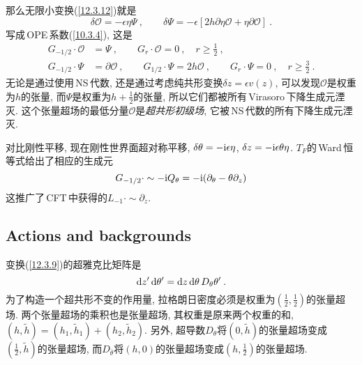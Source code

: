 那么无限小变换(\ref{12.3.12})就是
\begin{equation}
    \delta \mathcal{O} = -\epsilon\eta\varPsi\:, \qquad 
    \delta \varPsi=-\epsilon[2h\partial\eta \mathcal{O}+\eta\partial\mathcal{O}] \:. \label{12.3.14}
\end{equation}
写成\,OPE\,系数(\ref{10.3.4}), 这是
\begin{subequations}
\begin{align}
    G_{-1/2}\cdot \mathcal{O} &= \varPsi\:, \qquad G_{r}\cdot \mathcal{O}=0\:, \quad r\geq \tfrac{1}{2} \:,\label{12.3.15a} \\ 
    G_{-1/2}\cdot \varPsi &= \partial\mathcal{O}\:, \qquad G_{1/2}\cdot \varPsi = 2h\mathcal{O}\:,
    \qquad G_{r}\cdot\varPsi=0\:,\quad r\geq \tfrac{3}{2} \:. \label{12.3.15b}
\end{align}\label{12.3.15}
\end{subequations}
无论是通过使用\,NS\,代数, 还是通过考虑纯共形变换$ \delta z=\epsilon v(z)$, 可以发现$ \mathcal{O} $是权重为$ h $的张量, 而$ \varPsi $是权重为$ h+\tfrac{1}{2} $的张量, 所以它们都被所有\,Virasoro\,下降生成元湮灭. 这个张量超场的最低分量$ \mathcal{O} $是{\emph{超共形初级场}}, 它被\,NS\,代数的所有下降生成元湮灭.

对比刚性平移, 现在刚性世界面超对称平移, $\delta\theta =-\mathrm{i}\epsilon\eta$, $\delta z=-\mathrm{i}\epsilon\theta\eta$. $T_{F} $的\,Ward\,恒等式给出了相应的生成元
\begin{equation}
    G_{-1/2}\cdot \sim -\mathrm{i} Q_{\theta} = -\mathrm{i}(\partial_{\theta}-\theta\partial_{z}) \label{12.3.16}
\end{equation}
这推广了\,CFT\,中获得的$ L_{-1}\cdot \sim \partial_{z}$.

\subsection*{Actions and backgrounds}

变换(\ref{12.3.9})的超雅克比矩阵是
\begin{equation}
    \mathrm{d} z^{\prime}\,\mathrm{d}\theta^{\prime} = \mathrm{d} z\,\mathrm{d}\theta\,D_{\theta}\theta^{\prime}\:. \label{12.3.17}
\end{equation}
为了构造一个超共形不变的作用量, 拉格朗日密度必须是权重为$ (\tfrac{1}{2},\tfrac{1}{2}) $的张量超场. 两个张量超场的乘积也是张量超场, 其权重是原来两个权重的和, $(h,\tilde{h})=(h_{1},\tilde{h}_{1})+(h_{2},\tilde{h}_{2})$. 另外, 超导数$ D_{\theta} $将$ (0,\tilde{h}) $的张量超场变成$ (\tfrac{1}{2},\tilde{h}) $的张量超场, 而$ D_{\bar{\theta}} $将$ (h,0) $的张量超场变成$ (h,\tfrac{1}{2}) $的张量超场.

